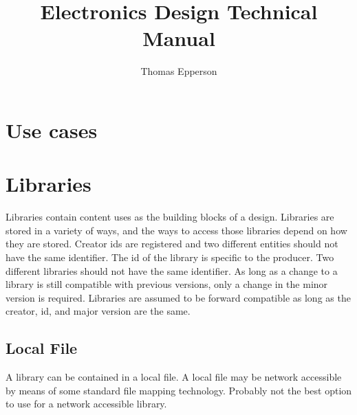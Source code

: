 \documentclass[letterpaper,12pt,twoside]{book}
\begin{document}
\title{Electronics Design Technical Manual}
\author{Thomas Epperson}
\maketitle
\newpage
\tableofcontents
\newpage

\chapter {Use cases}

\chapter {Libraries}
Libraries contain content uses as the building blocks of a design. Libraries are stored in a variety of ways, and the ways to access those libraries depend on how they are stored. Creator ids are registered and two different entities should not have the same identifier. The id of the library is specific to the producer. Two different libraries should not have the same identifier. As long as a change to a library is still compatible with previous versions, only a change in the minor version is required. Libraries are assumed to be forward compatible as long as the creator, id, and major version are the same.

\section {Local File}
A library can be contained in a local file. A local file may be network accessible by means of some standard file mapping technology. Probably not the best option to use for a network accessible library.
\end{document}
